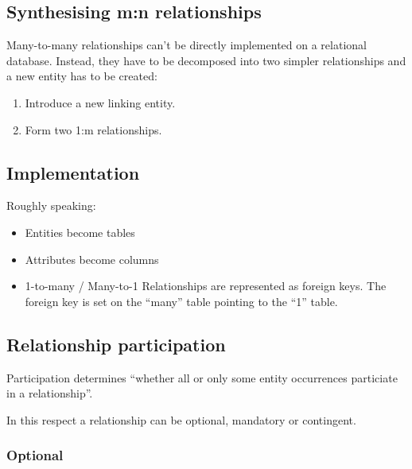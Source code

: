 \documentclass[slides]{pgnotes}
\begin{document}
\newpage

\begin{figure}[htbp]
\centering
\end{figure}

\subsection{Synthesising m:n relationships}
\label{synthesising-mn-relationships}

Many-to-many relationships can't be directly implemented on a relational
database. Instead, they have to be decomposed into two simpler
relationships and a new entity has to be created:

\begin{enumerate}
\def\labelenumi{\arabic{enumi}.}
\item
  Introduce a new linking entity.
\item
  Form two 1:m relationships.
\end{enumerate}

\subsection{Implementation}
\label{implementation}

Roughly speaking:

\begin{itemize}
\item
  Entities become tables
\item
  Attributes become columns
\item
  1-to-many / Many-to-1 Relationships are represented as foreign keys.
  The foreign key is set on the ``many'' table pointing to the ``1''
  table.
\end{itemize}

\subsection{Relationship participation}
\label{relationship-participation}

Participation determines ``whether all or only some entity occurrences
particiate in a relationship''.

In this respect a relationship can be optional, mandatory or contingent.

\subsubsection{Optional}
\label{optional}
\end{document}

